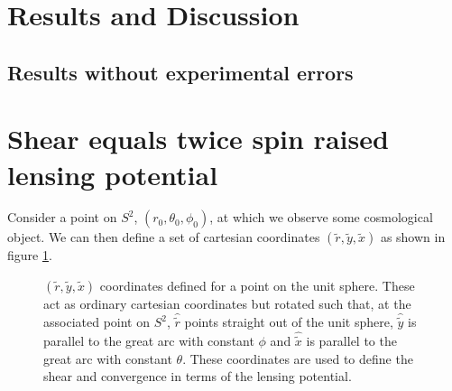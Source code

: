 \documentclass[11pt]{article} %
\begin{document}
\section{Results and Discussion}
\subsection{Results without experimental errors}





\appendix
\section{Shear equals twice spin raised lensing potential}

Consider a point on $S^2$, $(r_0, \theta_0, \phi_0)$, at which we observe some cosmological object. We can then define a set of cartesian coordinates $(\tilde r, \tilde y, \tilde x)$ as shown in figure \ref{fig:tildecoords}.

\begin{figure}[h!]
    \centering
    
    \caption{
        $(\tilde r, \tilde y, \tilde x)$ coordinates defined for a point on the unit sphere. These act as ordinary cartesian coordinates but rotated such that, at the associated point on $S^2$, $\hat{\tilde r}$ points straight out of the unit sphere, $\hat{\tilde y}$ is parallel to the great arc with constant $\phi$ and $\hat{\tilde x}$ is parallel to the great arc with constant $\theta$. These coordinates are used to define the shear and convergence in terms of the lensing potential.
        }
    \label{fig:tildecoords}
\end{figure}
\end{document}

